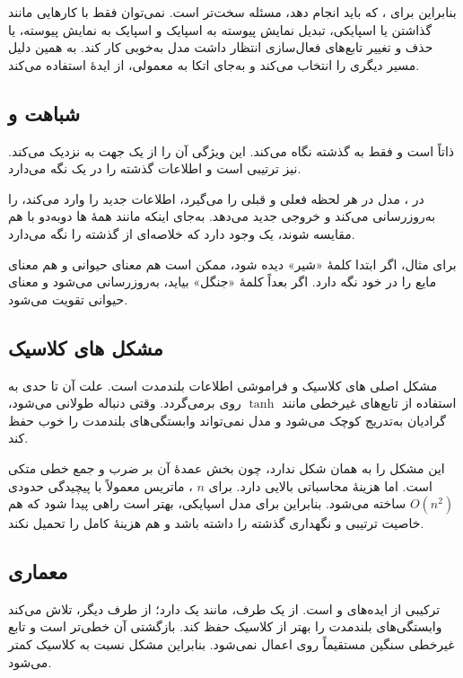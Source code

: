 بنابراین برای ، که باید  انجام دهد، مسئله سخت‌تر است. نمی‌توان فقط با کارهایی مانند گذاشتن  یا  اسپایکی، تبدیل نمایش پیوسته به اسپایک و اسپایک به نمایش پیوسته، یا حذف و تغییر تابع‌های فعال‌سازی انتظار داشت مدل به‌خوبی کار کند.  به همین دلیل مسیر دیگری را انتخاب می‌کند و به‌جای اتکا به  معمولی، از ایدهٔ  استفاده می‌کند.

\subsection{شباهت  و }
 ذاتاً  است و فقط به گذشته نگاه می‌کند. این ویژگی آن را از یک جهت به  نزدیک می‌کند.  نیز ترتیبی است و اطلاعات گذشته را در یک  نگه می‌دارد.

در ، مدل در هر لحظه  فعلی و  قبلی را می‌گیرد، اطلاعات جدید را وارد  می‌کند،  را به‌روزرسانی می‌کند و خروجی جدید می‌دهد. به‌جای اینکه مانند  همهٔ ها دوبه‌دو با هم مقایسه شوند، یک  وجود دارد که خلاصه‌ای از گذشته را نگه می‌دارد.

برای مثال، اگر ابتدا کلمهٔ «شیر» دیده شود،  ممکن است هم معنای حیوانی و هم معنای مایع را در خود نگه دارد. اگر بعداً کلمهٔ «جنگل» بیاید،  به‌روزرسانی می‌شود و معنای حیوانی تقویت می‌شود.

\subsection{مشکل های کلاسیک}
مشکل اصلی های کلاسیک  و فراموشی اطلاعات بلندمدت است. علت آن تا حدی به استفاده از تابع‌های غیرخطی مانند \(\tanh\) روی  برمی‌گردد. وقتی دنباله طولانی می‌شود، گرادیان به‌تدریج کوچک می‌شود و مدل نمی‌تواند وابستگی‌های بلندمدت را خوب حفظ کند.

 این مشکل را به همان شکل ندارد، چون بخش عمدهٔ آن بر ضرب و جمع خطی متکی است. اما هزینهٔ محاسباتی بالایی دارد. برای \(n\) ، ماتریس  معمولاً با پیچیدگی حدودی \(O(n^2)\) ساخته می‌شود. بنابراین برای مدل اسپایکی، بهتر است راهی پیدا شود که هم خاصیت ترتیبی و نگهداری گذشته را داشته باشد و هم هزینهٔ  کامل را تحمیل نکند.

\subsection{معماری }
 ترکیبی از ایده‌های  و  است. از یک طرف، مانند  یک  دارد؛ از طرف دیگر، تلاش می‌کند وابستگی‌های بلندمدت را بهتر از  کلاسیک حفظ کند.  بازگشتی آن خطی‌تر است و تابع غیرخطی سنگین مستقیماً روی  اعمال نمی‌شود. بنابراین مشکل  نسبت به  کلاسیک کمتر می‌شود.

